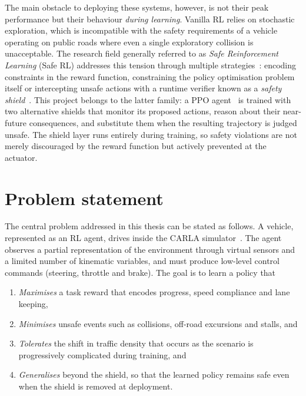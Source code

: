 The main obstacle to deploying these systems, however, is not their peak performance but their
behaviour \emph{during learning}. Vanilla RL relies on stochastic exploration, which is
incompatible with the safety requirements of a vehicle operating on public roads where even a single
exploratory collision is unacceptable. The research field generally referred to as
\emph{Safe Reinforcement Learning} (Safe RL) addresses this tension through multiple
strategies~\cite{garcia2015comprehensive}: encoding constraints in the reward function,
constraining the policy optimisation problem itself or intercepting unsafe actions with a
runtime verifier known as a \emph{safety shield}~\cite{alshiekh2018shielding}. This project
belongs to the latter family: a PPO agent~\cite{schulman2017ppo} is trained with two alternative
shields that monitor its proposed actions, reason about their near-future consequences, and
substitute them when the resulting trajectory is judged unsafe. The shield layer runs entirely
during training, so safety violations are not merely discouraged by the reward function but
actively prevented at the actuator.

\section{Problem statement}\label{sec:intro-problem}

The central problem addressed in this thesis can be stated as follows. A vehicle, represented as
an RL agent, drives inside the CARLA simulator~\cite{dosovitskiy2017carla}. The agent observes a
partial representation of the environment through virtual sensors and a limited number of
kinematic variables, and must produce low-level control commands (steering, throttle and brake).
The goal is to learn a policy that

\begin{enumerate}
  \item \emph{Maximises} a task reward that encodes progress, speed compliance and lane keeping,
  \item \emph{Minimises} unsafe events such as collisions, off-road excursions and stalls, and
  \item \emph{Tolerates} the shift in traffic density that occurs as the scenario is progressively
        complicated during training, and
  \item \emph{Generalises} beyond the shield, so that the learned policy remains safe even when the
        shield is removed at deployment.
\end{enumerate}

